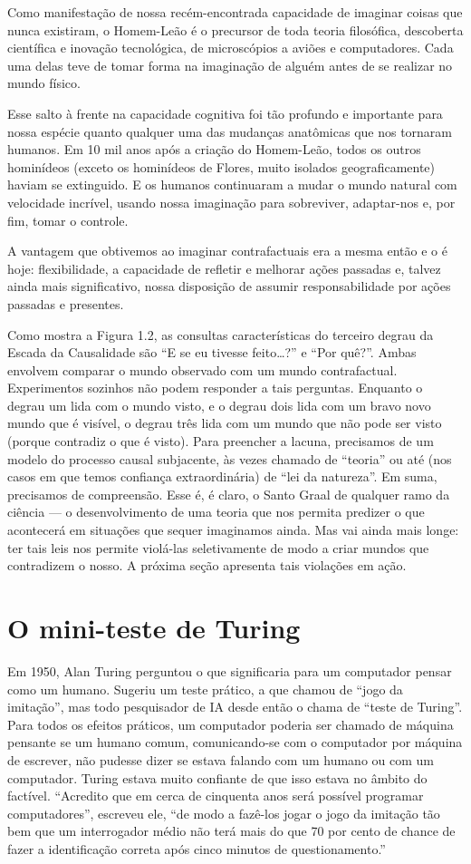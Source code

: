 \documentclass[11pt,a5paper,twoside]{book}
\begin{document}
Como manifestação de nossa recém-encontrada capacidade de imaginar coisas que nunca existiram, o Homem-Leão é o precursor de toda teoria filosófica, descoberta científica e inovação tecnológica, de microscópios a aviões e computadores. Cada uma delas teve de tomar forma na imaginação de alguém antes de se realizar no mundo físico.

Esse salto à frente na capacidade cognitiva foi tão profundo e importante para nossa espécie quanto qualquer uma das mudanças anatômicas que nos tornaram humanos. Em 10 mil anos após a criação do Homem-Leão, todos os outros hominídeos (exceto os hominídeos de Flores, muito isolados geograficamente) haviam se extinguido. E os humanos continuaram a mudar o mundo natural com velocidade incrível, usando nossa imaginação para sobreviver, adaptar-nos e, por fim, tomar o controle.

A vantagem que obtivemos ao imaginar contrafactuais era a mesma então e o é hoje: flexibilidade, a capacidade de refletir e melhorar ações passadas e, talvez ainda mais significativo, nossa disposição de assumir responsabilidade por ações passadas e presentes.

Como mostra a Figura 1.2, as consultas características do terceiro degrau da Escada da Causalidade são “E se eu tivesse feito…?” e “Por quê?”. Ambas envolvem comparar o mundo observado com um mundo contrafactual. Experimentos sozinhos não podem responder a tais perguntas. Enquanto o degrau um lida com o mundo visto, e o degrau dois lida com um bravo novo mundo que é visível, o degrau três lida com um mundo que não pode ser visto (porque contradiz o que é visto). Para preencher a lacuna, precisamos de um modelo do processo causal subjacente, às vezes chamado de “teoria” ou até (nos casos em que temos confiança extraordinária) de “lei da natureza”. Em suma, precisamos de compreensão. Esse é, é claro, o Santo Graal de qualquer ramo da ciência — o desenvolvimento de uma teoria que nos permita predizer o que acontecerá em situações que sequer imaginamos ainda. Mas vai ainda mais longe: ter tais leis nos permite violá-las seletivamente de modo a criar mundos que contradizem o nosso. A próxima seção apresenta tais violações em ação.

\section{O mini-teste de Turing}
Em 1950, Alan Turing perguntou o que significaria para um computador pensar como um humano. Sugeriu um teste prático, a que chamou de “jogo da imitação”, mas todo pesquisador de IA desde então o chama de “teste de Turing”. Para todos os efeitos práticos, um computador poderia ser chamado de máquina pensante se um humano comum, comunicando-se com o computador por máquina de escrever, não pudesse dizer se estava falando com um humano ou com um computador. Turing estava muito confiante de que isso estava no âmbito do factível. “Acredito que em cerca de cinquenta anos será possível programar computadores”, escreveu ele, “de modo a fazê-los jogar o jogo da imitação tão bem que um interrogador médio não terá mais do que 70 por cento de chance de fazer a identificação correta após cinco minutos de questionamento.”
\end{document}
